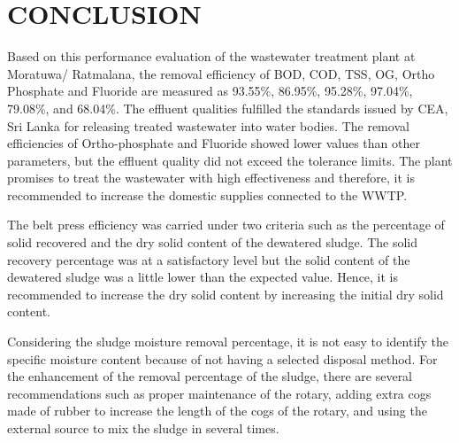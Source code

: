 \newpage
\section{CONCLUSION}


Based on this performance evaluation of the wastewater treatment plant at Moratuwa/ Ratmalana, the removal efficiency of \ac{BOD}, \ac{COD}, \ac{TSS}, \ac{OG}, Ortho Phosphate and Fluoride are measured as 93.55\%, 86.95\%, 95.28\%, 97.04\%, 79.08\%, and 68.04\%. The effluent qualities fulfilled the standards issued by \ac{CEA}, Sri Lanka for releasing treated wastewater into water bodies. The removal efficiencies of Ortho-phosphate and Fluoride showed lower values than other parameters, but the effluent quality did not exceed the tolerance limits. The plant promises to treat the wastewater with high effectiveness and therefore, it is recommended to increase the domestic supplies connected to the \ac{WWTP}.

The belt press efficiency was carried under two criteria such as the percentage of solid recovered and the dry solid content of the dewatered sludge. The solid recovery percentage was at a satisfactory level but the solid content of the dewatered sludge was a little lower than the expected value.  Hence, it is recommended to increase the dry solid content by increasing the initial dry solid content. 

Considering the sludge moisture removal percentage, it is not easy to identify the specific moisture content because of not having a selected disposal method. For the enhancement of the removal percentage of the sludge, there are several recommendations such as proper maintenance of the rotary, adding extra cogs made of rubber to increase the length of the cogs of the rotary, and using the external source to mix the sludge in several times.